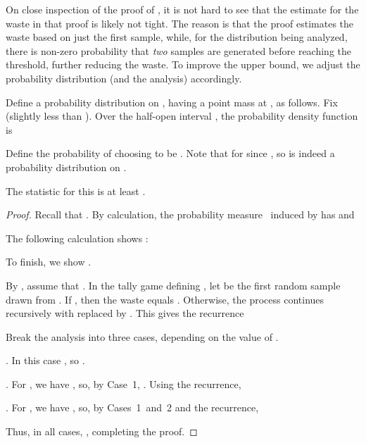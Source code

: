 On close inspection of the proof of , 
it is not hard to see that the estimate for the waste in that proof is likely not tight. 
The reason is that the proof estimates the waste based on just the first sample, 
while, for the distribution being analyzed,
there is non-zero probability that {\em two} samples
are generated before reaching the threshold, further reducing the waste.
To improve the upper bound,
we adjust the probability distribution (and the analysis) accordingly.

Define a probability distribution  on , having a point mass at , as follows.
Fix  (slightly less than ).
Over the half-open interval , the probability density function is



Define the probability of choosing  to be .
Note that  for  since ,
so  is indeed a probability distribution on .



\begin{lemma}\label{lemma: upper bound 2}
  The statistic  for this  is at least .
\end{lemma}

\begin{proof}
Recall that .
By calculation, the probability measure~ induced by  has
 and



\noindent
  The following calculation shows :

  

  To finish, we show .
  
  By , assume that .
  In the tally game defining ,
  let  be the first random sample drawn from .
  If , then the waste equals .
  Otherwise, the process continues recursively with  replaced by .
  This gives the recurrence



\noindent
Break the analysis into three cases, depending on the value of .

\medskip
\noindent
{} . In this case , 
  so .

\medskip
\noindent
{} .
  For , we have ,
  so, by Case~1, .
  Using the recurrence, 


 
\medskip
\noindent
{} .
 For , we have ,
 so, by Cases~1~and~2 and the recurrence,



Thus, in all cases, ,
completing the proof.
\end{proof}



